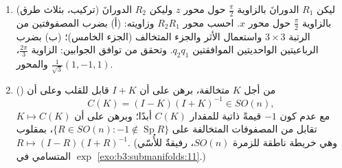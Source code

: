 \begin{problem}
\begin{enumerate}[resume]
  \item (تركيب، بثلاث طرق) ليكن $R_1$ الدورانَ بالزاوية
        $\frac\pi2$ حول محور $z$ وليكن $R_2$ الدورانَ بالزاوية
        $\frac\pi2$ حول محور $x$. احسب محور $R_2R_1$ وزاويته:
        (أ) بضرب المصفوفتين من الرتبة $3\times3$ واستعمال
        الأثر والجزء المتخالف (الجزء الخامس)؛ (ب) بضرب
        الرباعيتين الواحديتين الموافقتين $q_2q_1$. وتحقق من
        توافق الجوابين: الزاوية $\frac{2\pi}3$، والمحور
        $\frac1{\sqrt3}(1, -1, 1)$.
  \item () من أجل $K$ متخالفة، برهن على أن $I + K$
        قابل للقلب وعلى أن
        \[
        C(K) = (I - K)(I + K)^{-1} \in SO(n),
        \]
        مع عدم كون $-1$ قيمةً ذاتية للمقدار $C(K)$ أبدًا؛
        وبرهن على أن $K \mapsto C(K)$ تقابل من المصفوفات
        المتخالفة على $\{R \in SO(n) : -1 \notin
        \operatorname{Sp}R\}$، بمقلوب $R \mapsto (I -
        R)(I + R)^{-1}$. (وهي خريطة
        ناطقة للزمرة $SO(n)$، رفيقةٌ للأُسّي $\exp$ المتسامي في
        \cref{exo:b3:submanifolds:11}.)
\end{enumerate}
\end{problem}
